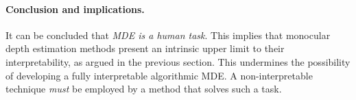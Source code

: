 \vspace{0.5cm}

\paragraph{Conclusion and implications.}
It can be concluded that \textit{MDE is a human task}.
This implies that monocular depth estimation methods present an intrinsic upper limit to their interpretability, as argued in the previous section.
This undermines the possibility of developing a fully interpretable algorithmic MDE.
A non-interpretable technique \textit{must} be employed by a method that solves such a task.

%
%

